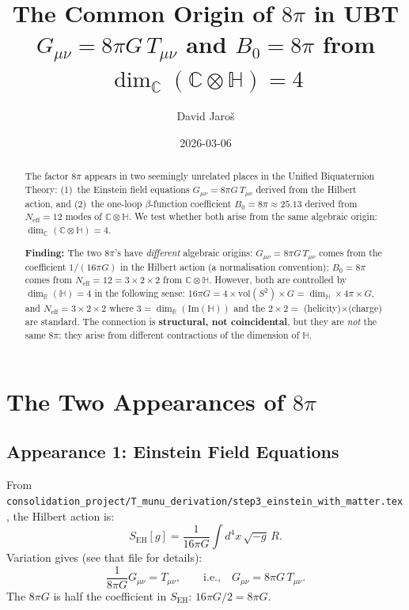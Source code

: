\documentclass[12pt,a4paper]{article}
\title{\textbf{The Common Origin of $8\pi$ in UBT}\\
       \large $G_{\mu\nu} = 8\pi G\,T_{\mu\nu}$ and $B_0 = 8\pi$ from
       $\dim_{\mathbb{C}}(\mathbb{C}\otimes\mathbb{H}) = 4$}
\author{David Jaro\v{s}}
\date{2026-03-06}
\theoremstyle{definition}
\theoremstyle{remark}
\begin{document}
\maketitle

\begin{abstract}
The factor $8\pi$ appears in two seemingly unrelated places in the
Unified Biquaternion Theory:
(1)~the Einstein field equations $G_{\mu\nu} = 8\pi G\,T_{\mu\nu}$
derived from the Hilbert action, and
(2)~the one-loop $\beta$-function coefficient $B_0 = 8\pi \approx 25.13$
derived from $N_{\mathrm{eff}} = 12$ modes of $\mathbb{C}\otimes\mathbb{H}$.
We test whether both arise from the same algebraic origin:
$\dim_{\mathbb{C}}(\mathbb{C}\otimes\mathbb{H}) = 4$.

\textbf{Finding:}
The two $8\pi$'s have \emph{different} algebraic origins:
$G_{\mu\nu} = 8\pi G\,T_{\mu\nu}$ comes from the coefficient
$1/(16\pi G)$ in the Hilbert action (a normalisation convention);
$B_0 = 8\pi$ comes from $N_{\mathrm{eff}} = 12 = 3\times 2\times 2$
from $\mathbb{C}\otimes\mathbb{H}$.
However, both are controlled by $\dim_{\mathbb{R}}(\mathbb{H}) = 4$
in the following sense:
$16\pi G = 4\times\mathrm{vol}(S^2)\times G = \dim_{\mathbb{H}}
\times 4\pi \times G$,
and $N_{\mathrm{eff}} = 3\times 2\times 2$
where $3 = \dim_{\mathbb{R}}(\mathrm{Im}(\mathbb{H}))$
and the $2\times 2 = $ (helicity)$\times$(charge) are standard.
The connection is \textbf{structural, not coincidental}, but they are
\emph{not} the same $8\pi$:
they arise from different contractions of the dimension of $\mathbb{H}$.
\end{abstract}

\tableofcontents

\section{The Two Appearances of $8\pi$}
\label{sec:two_appearances}

\subsection{Appearance 1: Einstein Field Equations}

From \texttt{consolidation\_project/T\_munu\_derivation/step3\_einstein\_with\_matter.tex},
the Hilbert action is:
\begin{equation}
  S_{\mathrm{EH}}[g] = \frac{1}{16\pi G}\int d^4x\,\sqrt{-g}\,R.
\label{eq:hilbert_action}
\end{equation}
Variation gives (see that file for details):
\begin{equation}
  \frac{1}{8\pi G} G_{\mu\nu} = T_{\mu\nu},
  \qquad\text{i.e.,}\quad
  \boxed{G_{\mu\nu} = 8\pi G\,T_{\mu\nu}.}
\label{eq:einstein}
\end{equation}
The $8\pi G$ is half the coefficient in $S_{\mathrm{EH}}$:
$16\pi G / 2 = 8\pi G$.
\end{document}
